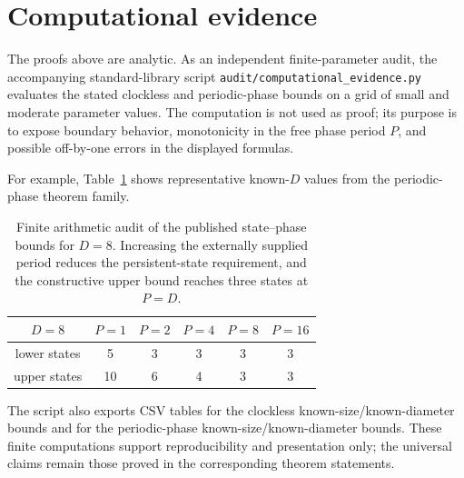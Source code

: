 \section{Computational evidence}\label{sec:computational-evidence}

The proofs above are analytic.  As an independent finite-parameter audit, the accompanying standard-library script \texttt{audit/computational\_evidence.py} evaluates the stated clockless and periodic-phase bounds on a grid of small and moderate parameter values.  The computation is not used as proof; its purpose is to expose boundary behavior, monotonicity in the free phase period $P$, and possible off-by-one errors in the displayed formulas.

For example, Table~\ref{tab:state-phase-audit} shows representative known-$D$ values from the periodic-phase theorem family.

\begin{table}[ht]
\centering
\begin{tabular}{c|ccccc}
$D=8$ & $P=1$ & $P=2$ & $P=4$ & $P=8$ & $P=16$ \\
\hline
lower states & 5 & 3 & 3 & 3 & 3 \\
upper states & 10 & 6 & 4 & 3 & 3
\end{tabular}
\caption{Finite arithmetic audit of the published state--phase bounds for $D=8$.  Increasing the externally supplied period reduces the persistent-state requirement, and the constructive upper bound reaches three states at $P=D$.}
\label{tab:state-phase-audit}
\end{table}

The script also exports CSV tables for the clockless known-size/known-diameter bounds and for the periodic-phase known-size/known-diameter bounds.  These finite computations support reproducibility and presentation only; the universal claims remain those proved in the corresponding theorem statements.
